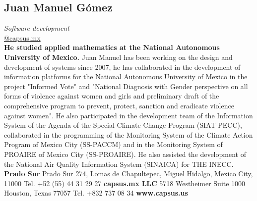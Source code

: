 \documentclass[
	a4paper,
	12pt,
	unnumberedsections,
]{CSSullivanBusinessReport}
\begin{document}
\subsection*{Juan Manuel Gómez}
\textit{Software development} \\
\href{mailto:@capsus.mx}{@capsus.mx} \\[0.5em]
\textbf{He studied applied mathematics at the National Autonomous University of Mexico.} Juan Manuel has been working on the design and development of systems since 2007, he has collaborated in the development of information platforms for the National Autonomous University of Mexico in the project "Informed Vote" and "National Diagnosis with Gender perspective on all forms of violence against women and girls and preliminary draft of the comprehensive program to prevent, protect, sanction and eradicate violence against women". He also participated in the development team of the Information System of the Agenda of the Special Climate Change Program (SIAT-PECC), collaborated in the programming of the Monitoring System of the Climate Action Program of Mexico City (SS-PACCM) and in the Monitoring System of PROAIRE of Mexico City (SS-PROAIRE). He also assisted the development of the National Air Quality Information System (SINAICA) for THE INECC. \textbf{Prado Sur} Prado Sur 274, Lomas de Chapultepec, Miguel Hidalgo, Mexico City, 11000 Tel. +52 (55) 44 31 29 27 \textbf{capsus.mx} \textbf{LLC} 5718 Westheimer Suite 1000 Houston, Texas 77057 Tel. +832 737 08 34 \textbf{www.capsus.us}
\end{document}
